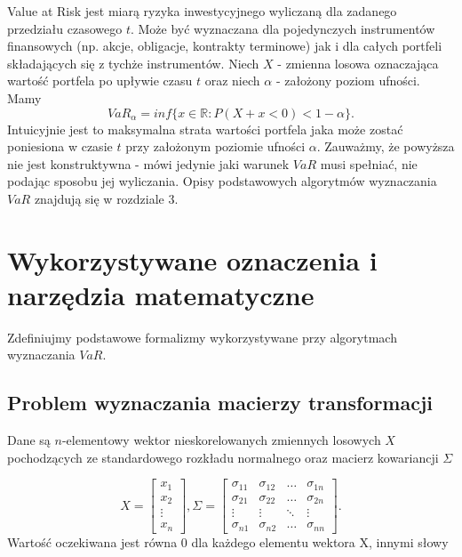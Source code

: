 \documentclass[11pt,titlepage]{article}
\numberwithin{equation}{section}
\begin{document}
Value at Risk jest miarą ryzyka inwestycyjnego wyliczaną dla zadanego przedziału czasowego $t$. Może być wyznaczana dla pojedynczych instrumentów finansowych (np. akcje, obligacje, kontrakty terminowe) jak i dla całych portfeli składających się z tychże instrumentów. Niech $X$ - zmienna losowa oznaczająca wartość portfela po upływie czasu $t$ oraz niech $\alpha$ - założony poziom ufności. Mamy
$$VaR_{\alpha}=inf\{ x\in \mathbb{R}:P(X+x<0) <  1-\alpha \}.$$
Intuicyjnie jest to maksymalna strata wartości portfela jaka może zostać poniesiona w czasie $t$ przy założonym poziomie ufności $\alpha$. Zauważmy, że powyższa nie jest konstruktywna - mówi jedynie jaki warunek $VaR$ musi spełniać, nie podając sposobu jej wyliczania. Opisy podstawowych algorytmów wyznaczania $VaR$ znajdują się w rozdziale 3.


\newpage
\section{Wykorzystywane oznaczenia i narzędzia matematyczne}
Zdefiniujmy podstawowe formalizmy wykorzystywane przy algorytmach wyznaczania $VaR$. 






\subsection{Problem wyznaczania macierzy transformacji}
Dane są $n$-elementowy wektor nieskorelowanych zmiennych losowych $X$ pochodzących ze standardowego rozkładu normalnego oraz macierz kowariancji $\Sigma$

\begin{equation} 
X=
\begin{bmatrix}
 x_1 \\ 
 x_2 \\
\vdots \\
x_n
\end{bmatrix}
,\Sigma=\begin{bmatrix}
\sigma_{11} & \sigma_{12} & \hdots & \sigma_{1n} \\ 
\sigma_{21} & \sigma_{22} & \hdots & \sigma_{2n} \\
\vdots & \vdots & \ddots & \vdots\\
\sigma_{n1} & \sigma_{n2} & \hdots & \sigma_{nn}
\end{bmatrix}.
\end{equation} 
Wartość oczekiwana jest  równa 0 dla każdego elementu wektora X, innymi słowy
\end{document}
